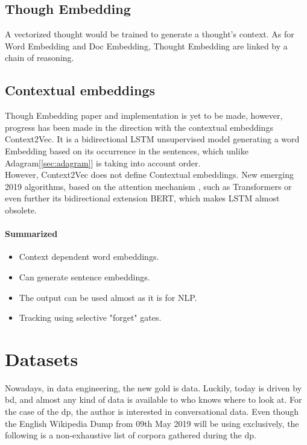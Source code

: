 \subsection{Though Embedding}
\label{sota:though-embedding}
A vectorized thought would be trained to generate a thought's context. As for Word Embedding and Doc Embedding,  Thought Embedding are linked by a chain of reasoning.

\subsection{Contextual embeddings}
\label{sota:contextual-embedding}
Though Embedding paper and implementation is yet to be made, however, progress has been made in the direction with the contextual embeddings Context2Vec\cite{article:context2vec}. It is a bidirectional LSTM\cite{article:lstm} unsupervised model generating a word Embedding based on its occurrence in the sentences, which unlike Adagram[\ref{sec:adagram}] is taking into account order. \\


However, Context2Vec does not define Contextual embeddings. New emerging 2019 algorithms, based on the attention mechanism \cite{article:attention-is-all-you-need}, such as Transformers\cite{article:transformer} or even further its bidirectional extension BERT\cite{article:bert}, which makes LSTM almost obsolete.

\paragraph{Summarized}
\begin{itemize}
    \setlength\itemsep{0em}
    \item Context dependent word embeddings.
    \item Can generate sentence embeddings.
    \item The output can be used almost as it is for NLP.
    \item Tracking using selective "forget" gates.
\end{itemize}


\section{Datasets}
\label{sota:datasets}
Nowadays, in data engineering, the new gold is data. Luckily, today is driven by \gls{bd}, and almost any kind of data is available to who knows where to look at. For the case of the \gls{dp}, the author is interested in conversational data. Even though the English Wikipedia Dump from 09th May 2019 will be using exclusively, the following is a non-exhaustive list of corpora gathered during the \gls{dp}.

